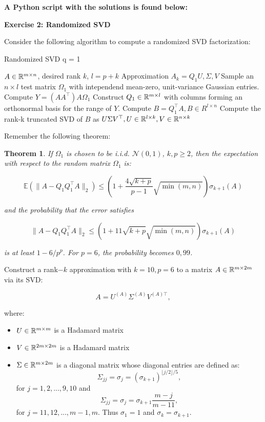 \documentclass[11pt]{article}
\newtheorem{theorem}{Theorem}
\begin{document}
\textbf{A Python script with the solutions is found below:}



\bigskip

{\bf{Exercise 2: Randomized SVD}}

Consider the following algorithm to compute a randomized SVD factorization:

\scriptsize
\begin{algorithm}
\caption{Randomized SVD q = 1}\label{Randomized SVD}
\begin{algorithmic}
\Input $A \in \mathbb{R}^{m \times n}$, desired rank $k$, $l = p+k$
\Output Approximation $A_k = Q_1U, \Sigma, V$
\State Sample an $n \times l$ test matrix $\Omega_1$ with intependend mean-zero, unit-variance Gaussian entries.
\State Compute $Y = (AA^{\top})A\Omega_1$
\State Construct $Q_1 \in \mathbb{R}^{m \times l}$ with columns forming an orthonormal basis for the range of $Y$.
\State Compute $B = Q_1^{\top} A, B \in R^{l \times n}$
\State Compute the rank-k truncated SVD of $B$ as $U\Sigma V^{\top}, U \in \mathbb{R}^{l \times k}, V\in \mathbb{R}^{n \times k}$
\end{algorithmic}
\end{algorithm}
\normalsize

Remember the following theorem:

\begin{theorem}
If $\Omega_1$ is chosen to be i.i.d. $\mathcal{N}(0, 1)$, $k, p \geq 2$, then the expectation with respect to the random matrix $\Omega_1$ is:

\[ \mathbb{E}(\|A - Q_1Q_1^{\top}A\|_2) \leq \left( 1 + \frac{4 \sqrt{k + p}}{p - 1} \sqrt{\min(m, n)} \right) \sigma_{k+1}(A) \]

and the probability that the error satisfies

\[ \|A - Q_1Q_1^{\top}A\|_2 \leq \left( 1 + 11 \sqrt{k + p} \sqrt{\min(m, n)} \right)\sigma_{k+1}(A) \]

is at least $1 - 6/p^p$. For $p = 6$, the probability becomes $0,99$.

\end{theorem}

Construct a rank$-k$ approximation with $k = 10, p=6$ to a matrix $A \in \mathbb{R}^{m \times 2m}$ via its SVD:

\[ A = U^{(A)} \Sigma^{(A)} V^{(A)\top}, \]

where:

\begin{itemize}
    \item $U \in \mathbb{R}^{m \times m}$ is a Hadamard matrix
    \item $V \in \mathbb{R}^{2m \times 2m}$ is a Hadamard matrix
    \item $\Sigma \in \mathbb{R}^{m \times 2m}$ is a diagonal matrix whose diagonal entries are defined as:
    \[ \Sigma_{jj} = \sigma_j = (\sigma_{k+1})^{\lfloor j/2 \rfloor / 5}, \]
    for $j = 1, 2, ..., 9, 10$ and
    \[ \Sigma_{jj} = \sigma_j = \sigma_{k+1} \frac{m-j}{m-11}, \]
    for $j = 11, 12, ..., m-1, m$. Thus $\sigma_1 = 1$ and $\sigma_k = \sigma_{k+1}$.
\end{itemize}
\end{document}
